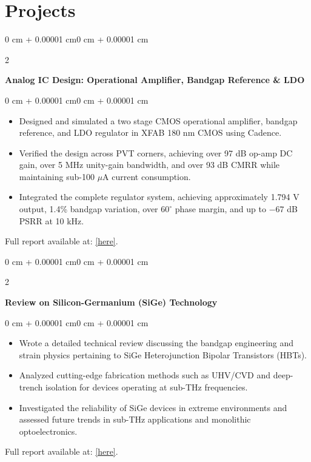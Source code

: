 \documentclass[10pt, letterpaper]{article}
\newenvironment{highlights}{
    \begin{itemize}[
        topsep=0.10 cm,
        parsep=0.10 cm,
        partopsep=0pt,
        itemsep=0pt,
        leftmargin=0 cm + 10pt
    ]
}{
    \end{itemize}
} %
\newenvironment{onecolentry}{
    \begin{adjustwidth}{0 cm + 0.00001 cm}{0 cm + 0.00001 cm}
}{
    \end{adjustwidth}
} %
\newenvironment{twocolentry}[2][]{
    \onecolentry
    \def\secondColumn{#2}
    \setcolumnwidth{\fill, 4.5 cm}
    \begin{paracol}{2}
}{
    \switchcolumn \raggedleft \secondColumn
    \end{paracol}
    \endonecolentry
} %
\begin{document}
\section{Projects}

\vspace{0.2 cm}
\begin{twocolentry}{}
    \textbf{Analog IC Design: Operational Amplifier, Bandgap Reference \& LDO}
\end{twocolentry}

\vspace{0.10 cm}
\begin{onecolentry}
    \begin{highlights}
        \item Designed and simulated a two stage CMOS operational amplifier, bandgap reference, and LDO regulator in XFAB 180 nm CMOS using Cadence.
        \item Verified the design across PVT corners, achieving over 97 dB op-amp DC gain, over 5 MHz unity-gain bandwidth, and over 93 dB CMRR while maintaining sub-100 $\mu$A current consumption.
        \item Integrated the complete regulator system, achieving approximately 1.794 V output, 1.4\% bandgap variation, over $60^\circ$ phase margin, and up to $-67$ dB PSRR at 10 kHz.
    \end{highlights}
    Full report available at: \href{https://drive.google.com/file/d/1EyeFLb7r0vsK6oKQAR1TiKlAlgsI0LLn/view?usp=drive_link}{[here]}.
\end{onecolentry}

\vspace{0.2 cm}
\begin{twocolentry}{}
    \textbf{Review on Silicon-Germanium (SiGe) Technology}
\end{twocolentry}

\vspace{0.10 cm}
\begin{onecolentry}
    \begin{highlights}
        \item Wrote a detailed technical review discussing the bandgap engineering and strain physics pertaining to SiGe Heterojunction Bipolar Transistors (HBTs).
        \item Analyzed cutting-edge fabrication methods such as UHV/CVD and deep-trench isolation for devices operating at sub-THz frequencies.
        \item Investigated the reliability of SiGe devices in extreme environments and assessed future trends in sub-THz applications and monolithic optoelectronics.
    \end{highlights}
        Full report available at: \href{https://drive.google.com/file/d/11weppkvTCNk7jUJ_5FexN0yiupOhWysw/view?usp=sharing}{[here]}.
\end{onecolentry}
\end{document}
